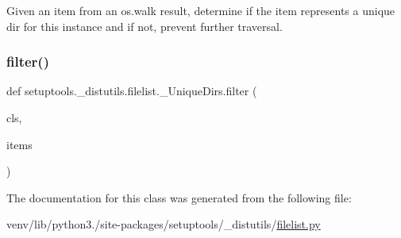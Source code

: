 \begin{DoxyVerb}Given an item from an os.walk result, determine
if the item represents a unique dir for this instance
and if not, prevent further traversal.
\end{DoxyVerb}
 \mbox{\label{classsetuptools_1_1__distutils_1_1filelist_1_1__UniqueDirs_a6d7b48734c3d7d090f60da66f94809cb}} 
\subsubsection{\texorpdfstring{filter()}{filter()}}
{\footnotesize\ttfamily def setuptools.\+\_\+distutils.\+filelist.\+\_\+\+Unique\+Dirs.\+filter (\begin{DoxyParamCaption}\item[{}]{cls,  }\item[{}]{items }\end{DoxyParamCaption})}



The documentation for this class was generated from the following file\+:\begin{DoxyCompactItemize}
\item 
venv/lib/python3./site-\/packages/setuptools/\+\_\+distutils/\hyperlink{filelist_8py}{filelist.\+py}\end{DoxyCompactItemize}
